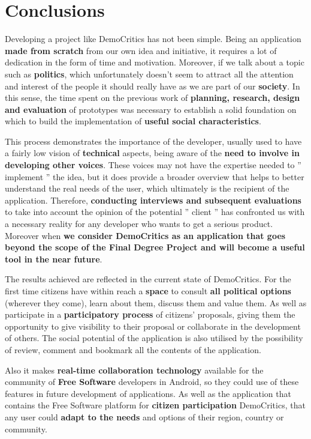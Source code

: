 \newpage
\chapter*{Conclusions}

Developing a project like DemoCritics has not been simple. Being an application \textbf{made from scratch} from our own idea and initiative, it requires a lot of dedication in the form of time and motivation. Moreover, if we talk about a topic such as \textbf{politics}, which unfortunately doesn't seem to attract all the attention and interest of the people it should really have as we are part of our \textbf{society}. In this sense, the time spent on the previous work of \textbf{planning, research, design and evaluation} of prototypes was necessary to establish a solid foundation on which to build the implementation of \textbf{useful social characteristics}.

This process demonstrates the importance of the developer, usually used to have a fairly low vision of \textbf{technical} aspects, being aware of the \textbf{need to involve in developing other voices}. These voices may not have the expertise needed to '' implement '' the idea, but it does provide a broader overview that helps to better understand the real needs of the user, which ultimately is the recipient of the application. Therefore, \textbf{conducting interviews and subsequent evaluations} to take into account the opinion of the potential '' client '' has confronted us with a necessary reality for any developer who wants to get a serious product. Moreover when \textbf{we consider DemoCritics as an application that goes beyond the scope of the Final Degree Project and will become a useful tool in the near future}.

The results achieved are reflected in the current state of DemoCritics. For the first time citizens have within reach a \textbf{space} to consult \textbf{all political options} (wherever they come), learn about them, discuss them and value them. As well as participate in a \textbf{participatory process} of citizens' proposals, giving them the opportunity to give visibility to their proposal or collaborate in the development of others. The social potential of the application is also utilised by the possibility of review, comment and bookmark all the contents of the application.

Also it makes \textbf{real-time collaboration technology} available for the community of \textbf{Free Software} developers in Android, so they could use of these features in future development of applications. As well as the application that contains the Free Software platform for \textbf{citizen participation} DemoCritics, that any user could \textbf{adapt to the needs} and options of their region, country or community.

